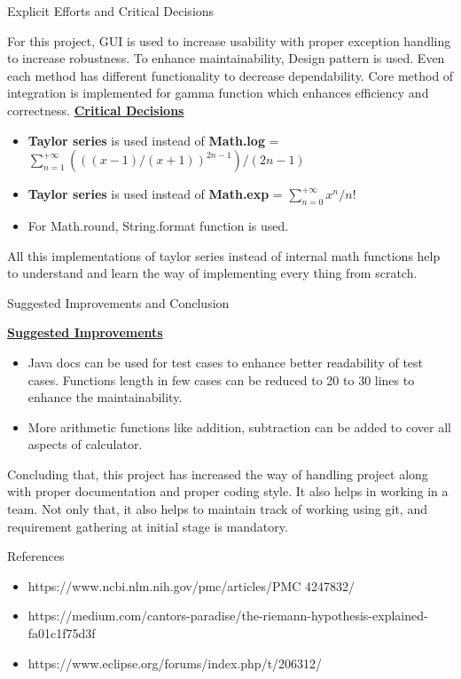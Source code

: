 \documentclass[final]{beamer}
\newlength{\onecolwid}
\begin{document}
\begin{frame}
\begin{columns}[t]
\begin{column}{\onecolwid}
\begin{exampleblock}{Explicit Efforts and Critical Decisions}
\small{For this project, GUI is used to increase usability with proper exception handling to increase robustness. To enhance maintainability, Design pattern is used. Even each method has different functionality to decrease dependability. Core method of integration is implemented for gamma function which enhances efficiency and correctness. 
\textbf{\underline{Critical Decisions}}
\begin{itemize}
\item \textbf{Taylor series} is used instead of \textbf{Math.log} = $\sum_{n=1}^{+\infty} (((x-1)/(x+1))^{2n-1})/(2n-1)$
\item \textbf{Taylor series} is used instead of \textbf{Math.exp} = $\sum_{n=0}^{+\infty} x^n/n!$
\item For Math.round, String.format function is used.
\end{itemize}
All this implementations of taylor series instead of internal math functions help to understand and learn the way of implementing every thing from scratch.
}


\end{exampleblock}


\begin{exampleblock}{\small{Suggested Improvements and Conclusion}}
\small{
\textbf{\underline{Suggested Improvements}}
\begin{itemize}
\item Java docs can be used for test cases to enhance better readability of test cases. Functions length in few cases can be reduced to 20 to 30 lines to enhance the maintainability.
\item More arithmetic functions like addition, subtraction can be added to cover all aspects of calculator.
\end{itemize}
Concluding that, this project has increased the way of handling project along with proper documentation and proper coding style. It also helps in working in a team. Not only that, it also helps to maintain track of working using git, and requirement gathering at initial stage is mandatory.}
\end{exampleblock}



\begin{exampleblock}{References}

\small{\begin{itemize}
\item  https://www.ncbi.nlm.nih.gov/pmc/articles/PMC 4247832/
\item https://medium.com/cantors-paradise/the-riemann-hypothesis-explained-fa01c1f75d3f
\item https://www.eclipse.org/forums/index.php/t/206312/
\end{itemize}}
\end{exampleblock}




\end{column}
\end{columns}
\end{frame}
\end{document}

